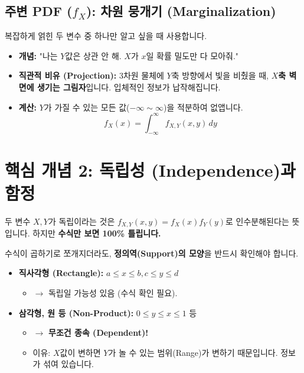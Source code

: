 \documentclass[11pt,a4paper]{book}
\theoremstyle{definition}
\begin{document}
\subsection{주변 PDF ($f_X$): 차원 뭉개기 (Marginalization)}
 

복잡하게 얽힌 두 변수 중 하나만 알고 싶을 때 사용합니다.
\begin{itemize}
    \item \textbf{개념:} "나는 $Y$값은 상관 안 해. $X$가 $x$일 확률 밀도만 다 모아줘."
    \item \textbf{직관적 비유 (Projection):} 3차원 물체에 $Y$축 방향에서 빛을 비췄을 때, \textbf{$X$축 벽면에 생기는 그림자}입니다. 입체적인 정보가 납작해집니다.
    \item \textbf{계산:} $Y$가 가질 수 있는 모든 값($-\infty \sim \infty$)을 적분하여 없앱니다.
    \[ f_X(x) = \int_{-\infty}^{\infty} f_{X,Y}(x,y) \, dy \]
\end{itemize}

\section{핵심 개념 2: 독립성 (Independence)과 함정}

두 변수 $X, Y$가 독립이라는 것은 $f_{X,Y}(x,y) = f_X(x)f_Y(y)$로 인수분해된다는 뜻입니다. 하지만 \textbf{수식만 보면 100\% 틀립니다.}

\begin{warningbox}[title={기하학적 함정 (The Geometry Trap)}]
수식이 곱하기로 쪼개지더라도, \textbf{정의역(Support)의 모양}을 반드시 확인해야 합니다.
\begin{itemize}
    \item \textbf{직사각형 (Rectangle):} $a \le x \le b, c \le y \le d$
    \begin{itemize}
        \item $\to$ 독립일 가능성 있음 (수식 확인 필요).
    \end{itemize}
    \item \textbf{삼각형, 원 등 (Non-Product):} $0 \le y \le x \le 1$ 등
    \begin{itemize}
        \item $\to$ \textbf{무조건 종속 (Dependent)!}
        \item 이유: $X$값이 변하면 $Y$가 놀 수 있는 범위(Range)가 변하기 때문입니다. 정보가 섞여 있습니다.
    \end{itemize}
\end{itemize}
 
\end{warningbox}
\end{document}

